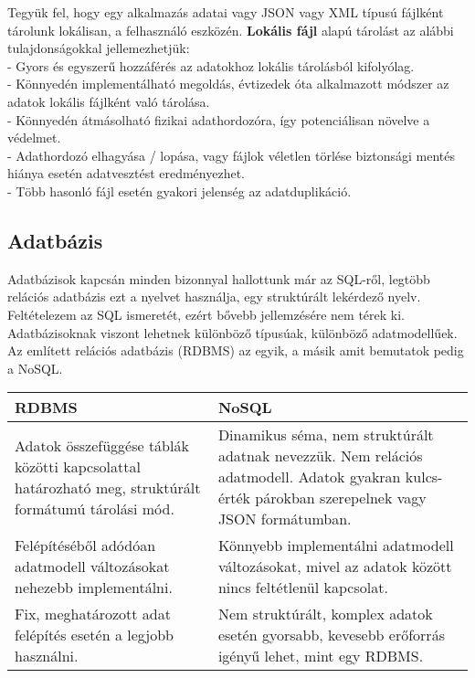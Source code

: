 \vspace{6pt}
Tegyük fel, hogy egy alkalmazás adatai vagy JSON vagy XML típusú fájlként tárolunk lokálisan, a felhasználó eszközén. \textbf{Lokális fájl} alapú tárolást az alábbi tulajdonságokkal jellemezhetjük:
\vspace{5pt}\\- Gyors és egyszerű hozzáférés az adatokhoz lokális tárolásból kifolyólag.
\vspace{5pt}\\- Könnyedén implementálható megoldás, évtizedek óta alkalmazott módszer az adatok lokális fájlként való tárolása.
\vspace{5pt}\\- Könnyedén átmásolható fizikai adathordozóra, így potenciálisan növelve a védelmet.
\vspace{5pt}\\- Adathordozó elhagyása / lopása, vagy fájlok véletlen törlése biztonsági mentés hiánya esetén adatvesztést eredményezhet.
\vspace{5pt}\\- Több hasonló fájl esetén gyakori jelenség az adatduplikáció. 


\newpage
\subsection{Adatbázis}

Adatbázisok kapcsán minden bizonnyal hallottunk már az SQL-ről, legtöbb relációs adatbázis ezt a nyelvet használja, egy struktúrált lekérdező nyelv. Feltételezem az SQL ismeretét, ezért bővebb jellemzésére nem térek ki. 
Adatbázisoknak viszont lehetnek különböző típusúak, különböző adatmodellűek. Az említett relációs adatbázis (RDBMS) az egyik, a másik amit bemutatok pedig a NoSQL. 

\begin{center}
	
	
	\begin{tabular}{|p{7.2cm}|p{7.2cm}|}
		\hline
		\textbf{RDBMS} & \textbf{NoSQL} \\
		\hline
		Adatok összefüggése táblák közötti kapcsolattal határozható meg, struktúrált formátumú tárolási mód. & Dinamikus séma, nem struktúrált adatnak nevezzük. Nem relációs adatmodell. Adatok gyakran kulcs-érték párokban szerepelnek vagy JSON formátumban.\\
		\hline
		Felépítéséből adódóan adatmodell változásokat nehezebb implementálni. & Könnyebb implementálni adatmodell változásokat, mivel az adatok között nincs feltétlenül kapcsolat. \\
		\hline
		Fix, meghatározott adat felépítés esetén a legjobb használni. & Nem struktúrált, komplex adatok esetén gyorsabb, kevesebb erőforrás igényű lehet, mint egy RDBMS.\\
		\hline
	\end{tabular}
\end{center}

